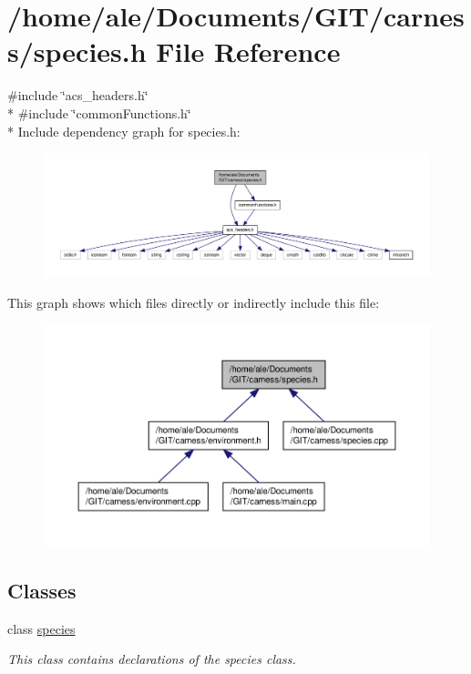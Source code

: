 \hypertarget{a00089}{\section{/home/ale/\-Documents/\-G\-I\-T/carness/species.h File Reference}
\label{a00089}
}
{\ttfamily \#include \char`\"{}acs\-\_\-headers.\-h\char`\"{}}\\*
{\ttfamily \#include \char`\"{}common\-Functions.\-h\char`\"{}}\\*
Include dependency graph for species.\-h\-:\nopagebreak
\begin{figure}[H]
\begin{center}
\leavevmode
\includegraphics[width=350pt]{a00139}
\end{center}
\end{figure}
This graph shows which files directly or indirectly include this file\-:\nopagebreak
\begin{figure}[H]
\begin{center}
\leavevmode
\includegraphics[width=350pt]{a00140}
\end{center}
\end{figure}
\subsection*{Classes}
\begin{DoxyCompactItemize}
\item 
class \hyperlink{a00016}{species}
\begin{DoxyCompactList}\small\item\em This class contains declarations of the species class. \end{DoxyCompactList}\end{DoxyCompactItemize}
